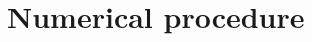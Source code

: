 \documentclass[a4paper,11pt]{article}
\renewcommand\({\left(}
\renewcommand\){\right)}
\renewcommand\[{\left[}
\renewcommand\]{\right]}
\newcommand{\paren}[1]{\left(#1\right)}
\newcommand{\fn}[1]{\!\paren{#1}} %
\newcommand{\GG}[1]{{\color[cmyk]{1,0.5,0,0}#1}}%
\theoremstyle{definition}
\newcommand{\mc}{\mathcal}
\begin{document}

\section{Numerical procedure}
\label{sec:numerical-procedure} 
\end{document}
